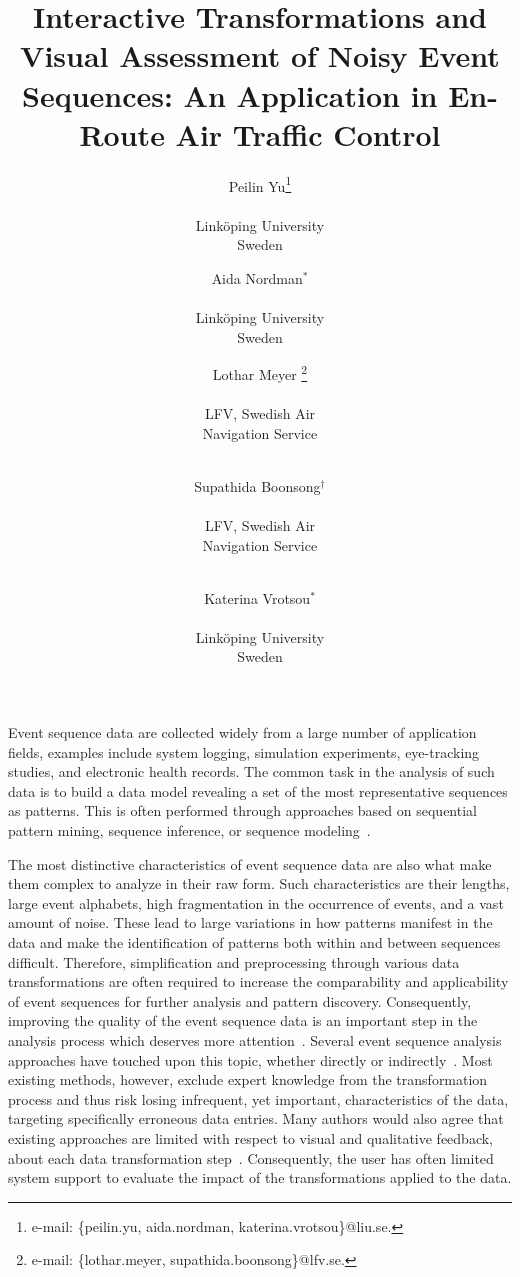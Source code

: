 \documentclass[camera]{vgtc}                          %
\title{Interactive Transformations and Visual Assessment of Noisy Event Sequences: An Application in En-Route Air Traffic Control\vspace{-5pt}}
\author{Peilin Yu\thanks{e-mail: \{peilin.yu, aida.nordman, katerina.vrotsou\}@liu.se.}\\
    \parbox{1in}{\scriptsize \centering Linköping University \\ Sweden} 
\and Aida Nordman$^*$\\
    \parbox{1in}{\scriptsize \centering Linköping University \\ Sweden} 
\and Lothar Meyer \thanks{e-mail: \{lothar.meyer, supathida.boonsong\}@lfv.se.}\\      
    \parbox{1in}{\scriptsize \centering LFV, Swedish Air \\ Navigation Service} \\
\and Supathida Boonsong$^\dagger$\\
    \parbox{1in}{\scriptsize \centering LFV, Swedish Air \\ Navigation Service} \\
\and Katerina Vrotsou$^*$\\
    \parbox{1in}{\scriptsize \centering Linköping University \\ Sweden}
}
\begin{document}
\setlength{\abovedisplayskip}{4pt}
\setlength{\belowdisplayskip}{4pt}





\vspace{-4pt}
\maketitle
\label{sec:intro}
Event sequence data are collected widely from a large number of application fields, examples include system logging, simulation experiments, eye-tracking studies, and electronic health records. The common task in the analysis of such data is to build a data model revealing a set of the most representative sequences as patterns. This is often performed through approaches based on sequential pattern mining, sequence inference, or sequence modeling~\cite{Jentner2019Visualization, Guo2021Survey}.

The most distinctive characteristics of event sequence data are also what make them complex to analyze in their raw form. Such characteristics are their lengths, large event alphabets, high fragmentation in the occurrence of events, and a vast amount of noise. These lead to large variations in how patterns manifest in the data and make the identification of patterns both within and between sequences difficult. 
Therefore, simplification and preprocessing through various data transformations are often required to increase the comparability and applicability of event sequences for further analysis and pattern discovery. 
Consequently, improving the quality of the event sequence data is an important step in the analysis process which deserves more attention~\cite{Kandel2011Research, Florian2015Data, Furche2016Data}.
Several event sequence analysis approaches have touched upon this topic, whether directly or indirectly~\cite{Monroe2013Temporal, Guo2018EventThread, Chen2018Sequence, Gotz2014DecisionFlow}.
Most existing methods, however, exclude expert knowledge from the transformation process and thus risk losing infrequent, yet important, characteristics of the data, targeting specifically erroneous data entries. 
Many authors would also agree that existing approaches are limited with respect to visual and qualitative feedback, about each data transformation step~\cite{Guo2021Survey, Shneiderman2019Interactive, Wu2016Survey}. Consequently, the user has often limited system support to evaluate the impact of the transformations applied to the data.
\end{document}
